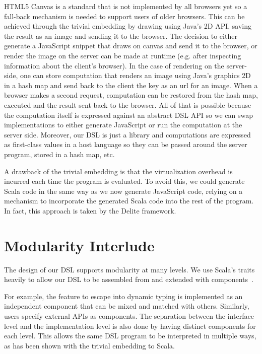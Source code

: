 \documentclass[runningheads,a4paper]{llncs}
\begin{document}
HTML5 Canvas is a standard that is not implemented by all browsers yet so a fall-back mechanism is needed to support users of older browsers. This can be achieved through the trivial embedding by drawing using Java's 2D API, saving the result as an image and sending it to the browser. The decision to either generate a JavaScript snippet that draws on canvas and send it to the browser, or render the image on the server can be made at runtime (e.g. after inspecting information about the client's browser). In the case of rendering on the server-side, one can store computation that renders an image using Java's graphics 2D in a hash map and send back to the client the key as an url for an image. When a browser makes a second request, computation can be restored from the hash map, executed and the result sent back to the browser. All of that is possible because the computation itself is expressed against an abstract DSL API so we can swap implementations to either generate JavaScript or run the computation at the server side. Moreover, our DSL is just a library and computations are expressed as first-class values in a host language so they can be passed around the server program, stored in a hash map, etc.

A drawback of the trivial embedding is that the virtualization overhead is incurred each time the program is evaluated. To avoid this, we could generate Scala code in the same way as we now generate JavaScript code, relying on a mechanism to incorporate the generated Scala code into the rest of the program. In fact, this approach is taken by the Delite framework.


\section{Modularity Interlude}\label{sec:modularity}

The design of our DSL supports modularity at many levels. We use
Scala's traits heavily to allow our DSL to be assembled from and
extended with components~\cite{components-scala}.

For example, the feature to escape into dynamic typing is implemented
as an independent component that can be mixed and matched with
others. Similarly, users specify external APIs as components. The
separation between the interface level and the implementation level is
also done by having distinct components for each level. This allows
the same DSL program to be interpreted in multiple ways, as has been
shown with the trivial embedding to Scala.
\end{document}
